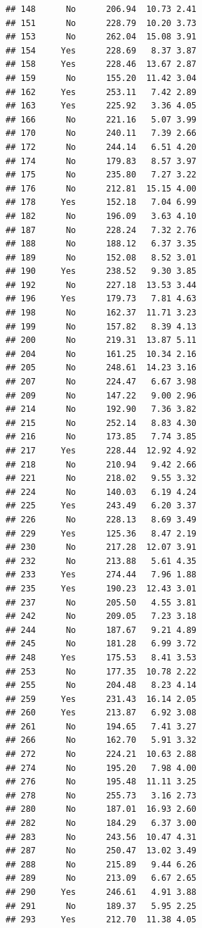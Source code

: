 \documentclass[
]{article}
\begin{document}
\begin{verbatim}
## 148      No      206.94  10.73 2.41
## 151      No      228.79  10.20 3.73
## 153      No      262.04  15.08 3.91
## 154     Yes      228.69   8.37 3.87
## 158     Yes      228.46  13.67 2.87
## 159      No      155.20  11.42 3.04
## 162     Yes      253.11   7.42 2.89
## 163     Yes      225.92   3.36 4.05
## 166      No      221.16   5.07 3.99
## 170      No      240.11   7.39 2.66
## 172      No      244.14   6.51 4.20
## 174      No      179.83   8.57 3.97
## 175      No      235.80   7.27 3.22
## 176      No      212.81  15.15 4.00
## 178     Yes      152.18   7.04 6.99
## 182      No      196.09   3.63 4.10
## 187      No      228.24   7.32 2.76
## 188      No      188.12   6.37 3.35
## 189      No      152.08   8.52 3.01
## 190     Yes      238.52   9.30 3.85
## 192      No      227.18  13.53 3.44
## 196     Yes      179.73   7.81 4.63
## 198      No      162.37  11.71 3.23
## 199      No      157.82   8.39 4.13
## 200      No      219.31  13.87 5.11
## 204      No      161.25  10.34 2.16
## 205      No      248.61  14.23 3.16
## 207      No      224.47   6.67 3.98
## 209      No      147.22   9.00 2.96
## 214      No      192.90   7.36 3.82
## 215      No      252.14   8.83 4.30
## 216      No      173.85   7.74 3.85
## 217     Yes      228.44  12.92 4.92
## 218      No      210.94   9.42 2.66
## 221      No      218.02   9.55 3.32
## 224      No      140.03   6.19 4.24
## 225     Yes      243.49   6.20 3.37
## 226      No      228.13   8.69 3.49
## 229     Yes      125.36   8.47 2.19
## 230      No      217.28  12.07 3.91
## 232      No      213.88   5.61 4.35
## 233     Yes      274.44   7.96 1.88
## 235     Yes      190.23  12.43 3.01
## 237      No      205.50   4.55 3.81
## 242      No      209.05   7.23 3.18
## 244      No      187.67   9.21 4.89
## 245      No      181.28   6.99 3.72
## 248     Yes      175.53   8.41 3.53
## 253      No      177.35  10.78 2.22
## 255      No      204.48   8.23 4.14
## 259     Yes      231.43  16.14 2.05
## 260     Yes      213.87   6.92 3.08
## 261      No      194.65   7.41 3.27
## 266      No      162.70   5.91 3.32
## 272      No      224.21  10.63 2.88
## 274      No      195.20   7.98 4.00
## 276      No      195.48  11.11 3.25
## 278      No      255.73   3.16 2.73
## 280      No      187.01  16.93 2.60
## 282      No      184.29   6.37 3.00
## 283      No      243.56  10.47 4.31
## 287      No      250.47  13.02 3.49
## 288      No      215.89   9.44 6.26
## 289      No      213.09   6.67 2.65
## 290     Yes      246.61   4.91 3.88
## 291      No      189.37   5.95 2.25
## 293     Yes      212.70  11.38 4.05

\end{verbatim}
\end{document}
